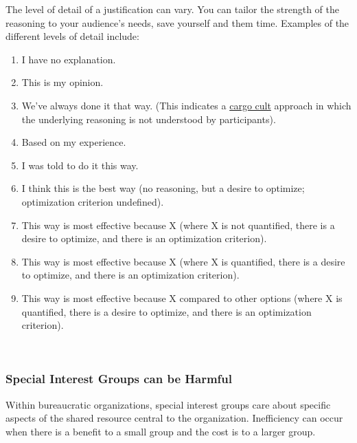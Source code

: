 The level of detail of a justification can vary. You can tailor the strength of the reasoning to your audience's needs, save yourself and them time. Examples of the different levels of detail include:
\begin{enumerate}
    \item I have no explanation.
    \item This is my opinion.
    \item We've always done it that way. (This indicates a \href{https://en.wikipedia.org/wiki/Cargo_cult}{cargo cult} approach in which the underlying reasoning is not understood by participants).
    \iftoggle{WPinmargin}{\marginpar{$>$Wikipedia: Cargo cult}}{ }%
    \item Based on my experience.
    \item I was told to do it this way.
    \item I think this is the best way (no reasoning, but a desire to optimize; optimization criterion undefined).
    \item This way is most effective because X (where X is not quantified, there is a desire to optimize, and there is an optimization criterion).
    \item This way is most effective because X (where X is quantified, there is a desire to optimize, and there is an optimization criterion).
    \item This way is most effective because X compared to other options (where X is quantified, there is a desire to optimize, and there is an optimization criterion).
\end{enumerate}


\ \\



\subsubsection*{Special Interest Groups can be Harmful}

Within bureaucratic organizations, special interest groups care about specific aspects of the shared resource central to the organization. 
Inefficiency can occur when there is a benefit to a small group and the cost is to a larger group.

